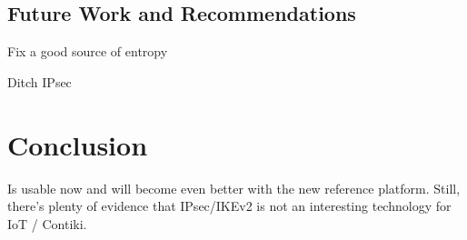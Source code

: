 \documentclass[final,a4paper,twoside,11pt,onecolumn]{report}
\begin{document}










\section{Future Work and Recommendations}
\label{sec:fw}

Fix a good source of entropy

Ditch IPsec 

   
\chapter{Conclusion}
Is usable now and will become even better with the new reference platform. Still, there's plenty of evidence that IPsec/IKEv2 is not an interesting technology for IoT / Contiki.






\end{document}

